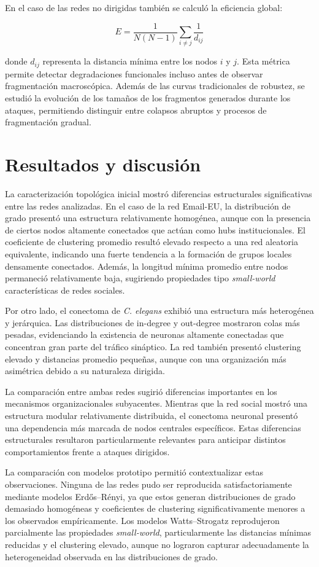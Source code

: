 En el caso de las redes no dirigidas también se calculó la eficiencia global:

\[
E = \frac{1}{N(N-1)}\sum_{i \neq j}\frac{1}{d_{ij}}
\]

donde \(d_{ij}\) representa la distancia mínima entre los nodos \(i\) y \(j\). Esta métrica permite detectar degradaciones funcionales incluso antes de observar fragmentación macroscópica. Además de las curvas tradicionales de robustez, se estudió la evolución de los tamaños de los fragmentos generados durante los ataques, permitiendo distinguir entre colapsos abruptos y procesos de fragmentación gradual.

\section{Resultados y discusión}

La caracterización topológica inicial mostró diferencias estructurales significativas entre las redes analizadas. En el caso de la red Email-EU, la distribución de grado presentó una estructura relativamente homogénea, aunque con la presencia de ciertos nodos altamente conectados que actúan como hubs institucionales. El coeficiente de clustering promedio resultó elevado respecto a una red aleatoria equivalente, indicando una fuerte tendencia a la formación de grupos locales densamente conectados. Además, la longitud mínima promedio entre nodos permaneció relativamente baja, sugiriendo propiedades tipo \textit{small-world} características de redes sociales.

Por otro lado, el conectoma de \textit{C. elegans} exhibió una estructura más heterogénea y jerárquica. Las distribuciones de in-degree y out-degree mostraron colas más pesadas, evidenciando la existencia de neuronas altamente conectadas que concentran gran parte del tráfico sináptico. La red también presentó clustering elevado y distancias promedio pequeñas, aunque con una organización más asimétrica debido a su naturaleza dirigida.

La comparación entre ambas redes sugirió diferencias importantes en los mecanismos organizacionales subyacentes. Mientras que la red social mostró una estructura modular relativamente distribuida, el conectoma neuronal presentó una dependencia más marcada de nodos centrales específicos. Estas diferencias estructurales resultaron particularmente relevantes para anticipar distintos comportamientos frente a ataques dirigidos.

La comparación con modelos prototipo permitió contextualizar estas observaciones. Ninguna de las redes pudo ser reproducida satisfactoriamente mediante modelos Erdős--Rényi, ya que estos generan distribuciones de grado demasiado homogéneas y coeficientes de clustering significativamente menores a los observados empíricamente. Los modelos Watts--Strogatz reprodujeron parcialmente las propiedades \textit{small-world}, particularmente las distancias mínimas reducidas y el clustering elevado, aunque no lograron capturar adecuadamente la heterogeneidad observada en las distribuciones de grado.

